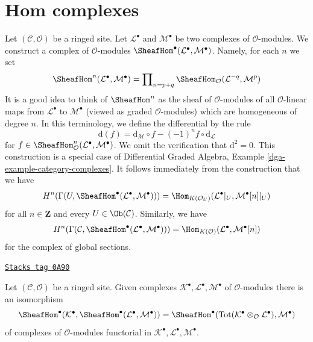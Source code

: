 \section{Hom complexes}
\label{sites-cohomology-section-hom-complexes}
Let $(\mathcal{C}, \mathcal{O})$ be a ringed site. Let
$\mathcal{L}^\bullet$ and $\mathcal{M}^\bullet$ be two complexes
of $\mathcal{O}$-modules. We construct a complex
of $\mathcal{O}$-modules
$\SheafHom^\bullet(\mathcal{L}^\bullet, \mathcal{M}^\bullet)$.
Namely, for each $n$ we set
$$
\SheafHom^n(\mathcal{L}^\bullet, \mathcal{M}^\bullet) =
\prod\nolimits_{n = p + q}
\SheafHom_\mathcal{O}(\mathcal{L}^{-q}, \mathcal{M}^p)
$$
It is a good idea to think of $\SheafHom^n$ as the
sheaf of $\mathcal{O}$-modules of all $\mathcal{O}$-linear
maps from $\mathcal{L}^\bullet$ to $\mathcal{M}^\bullet$
(viewed as graded $\mathcal{O}$-modules) which are homogeneous
of degree $n$. In this terminology, we define the differential by the rule
$$
\text{d}(f) =
\text{d}_\mathcal{M} \circ f - (-1)^n f \circ \text{d}_\mathcal{L}
$$
for
$f \in \SheafHom^n_\mathcal{O}(\mathcal{L}^\bullet, \mathcal{M}^\bullet)$.
We omit the verification that $\text{d}^2 = 0$.
This construction is a special case of
Differential Graded Algebra, Example \ref{dga-example-category-complexes}.
It follows immediately from the construction that we have
\begin{equation}
\label{equation-cohomology-hom-complex}
H^n(\Gamma(U, \SheafHom^\bullet(\mathcal{L}^\bullet, \mathcal{M}^\bullet))) =
\Hom_{K(\mathcal{O}_U)}(\mathcal{L}^\bullet|_U, \mathcal{M}^\bullet[n]|_U)
\end{equation}
for all $n \in \mathbf{Z}$ and every $U \in \Ob(\mathcal{C})$. Similarly,
we have
\begin{equation}
\label{equation-global-cohomology-hom-complex}
H^n(\Gamma(\mathcal{C},
\SheafHom^\bullet(\mathcal{L}^\bullet, \mathcal{M}^\bullet))) =
\Hom_{K(\mathcal{O})}(\mathcal{L}^\bullet, \mathcal{M}^\bullet[n])
\end{equation}
for the complex of global sections.

\begin{lemma}[Compose]
\label{sites-cohomology-lemma-compose}
\href{https://stacks.math.columbia.edu/tag/0A90}{\texttt{Stacks tag 0A90}}

Let $(\mathcal{C}, \mathcal{O})$ be a ringed site.
Given complexes $\mathcal{K}^\bullet, \mathcal{L}^\bullet, \mathcal{M}^\bullet$
of $\mathcal{O}$-modules there is an isomorphism
$$
\SheafHom^\bullet(\mathcal{K}^\bullet,
\SheafHom^\bullet(\mathcal{L}^\bullet, \mathcal{M}^\bullet))
=
\SheafHom^\bullet(\text{Tot}(\mathcal{K}^\bullet \otimes_\mathcal{O}
\mathcal{L}^\bullet), \mathcal{M}^\bullet)
$$
of complexes of $\mathcal{O}$-modules functorial in
$\mathcal{K}^\bullet, \mathcal{L}^\bullet, \mathcal{M}^\bullet$.
\end{lemma}

